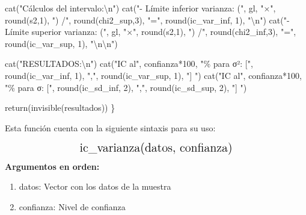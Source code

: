 \documentclass[
  spanish,
  letterpaper,
]{book}
\newenvironment{Shaded}{\begin{snugshade}}{\end{snugshade}}
\newcommand{\DecValTok}[1]{\textcolor[rgb]{0.68,0.00,0.00}{#1}}
\newcommand{\FunctionTok}[1]{\textcolor[rgb]{0.28,0.35,0.67}{#1}}
\newcommand{\NormalTok}[1]{\textcolor[rgb]{0.00,0.23,0.31}{#1}}
\newcommand{\SpecialCharTok}[1]{\textcolor[rgb]{0.37,0.37,0.37}{#1}}
\newcommand{\StringTok}[1]{\textcolor[rgb]{0.13,0.47,0.30}{#1}}
\begin{document}
\begin{Shaded}
\begin{Highlighting}[]
  \FunctionTok{cat}\NormalTok{(}\StringTok{"Cálculos del intervalo:}\SpecialCharTok{\textbackslash{}n}\StringTok{"}\NormalTok{)}
  \FunctionTok{cat}\NormalTok{(}\StringTok{"{-} Límite inferior varianza: ("}\NormalTok{, gl, }\StringTok{"×"}\NormalTok{, }\FunctionTok{round}\NormalTok{(s2,}\DecValTok{1}\NormalTok{), }\StringTok{") /"}\NormalTok{, }
      \FunctionTok{round}\NormalTok{(chi2\_sup,}\DecValTok{3}\NormalTok{), }\StringTok{"="}\NormalTok{, }\FunctionTok{round}\NormalTok{(ic\_var\_inf, }\DecValTok{1}\NormalTok{), }\StringTok{"}\SpecialCharTok{\textbackslash{}n}\StringTok{"}\NormalTok{)}
  \FunctionTok{cat}\NormalTok{(}\StringTok{"{-} Límite superior varianza: ("}\NormalTok{, gl, }\StringTok{"×"}\NormalTok{, }\FunctionTok{round}\NormalTok{(s2,}\DecValTok{1}\NormalTok{), }\StringTok{") /"}\NormalTok{, }
      \FunctionTok{round}\NormalTok{(chi2\_inf,}\DecValTok{3}\NormalTok{), }\StringTok{"="}\NormalTok{, }\FunctionTok{round}\NormalTok{(ic\_var\_sup, }\DecValTok{1}\NormalTok{), }\StringTok{"}\SpecialCharTok{\textbackslash{}n\textbackslash{}n}\StringTok{"}\NormalTok{)}
  
  \FunctionTok{cat}\NormalTok{(}\StringTok{"RESULTADOS:}\SpecialCharTok{\textbackslash{}n}\StringTok{"}\NormalTok{)}
  \FunctionTok{cat}\NormalTok{(}\StringTok{"IC al"}\NormalTok{, confianza}\SpecialCharTok{*}\DecValTok{100}\NormalTok{, }\StringTok{"\% para σ²: ["}\NormalTok{, }\FunctionTok{round}\NormalTok{(ic\_var\_inf, }\DecValTok{1}\NormalTok{), }
      \StringTok{","}\NormalTok{, }\FunctionTok{round}\NormalTok{(ic\_var\_sup, }\DecValTok{1}\NormalTok{), }\StringTok{"] "}\NormalTok{)}
  \FunctionTok{cat}\NormalTok{(}\StringTok{"IC al"}\NormalTok{, confianza}\SpecialCharTok{*}\DecValTok{100}\NormalTok{, }\StringTok{"\% para σ:  ["}\NormalTok{, }\FunctionTok{round}\NormalTok{(ic\_sd\_inf, }\DecValTok{2}\NormalTok{), }
      \StringTok{","}\NormalTok{, }\FunctionTok{round}\NormalTok{(ic\_sd\_sup, }\DecValTok{2}\NormalTok{), }\StringTok{"] "}\NormalTok{)}
  
  \FunctionTok{return}\NormalTok{(}\FunctionTok{invisible}\NormalTok{(resultados))}
\NormalTok{\}}
\end{Highlighting}
\end{Shaded}

Esta función cuenta con la siguiente sintaxis para su uso:

\[
\Large \text{ic\_varianza(datos, confianza)}
\] \textbf{Argumentos en orden:}

\begin{enumerate}
\def\labelenumi{\arabic{enumi}.}
\item
  datos: Vector con los datos de la muestra
\item
  confianza: Nivel de confianza
\end{enumerate}
\end{document}
